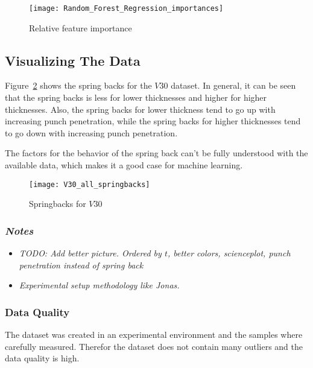 \begin{figure}[htb]
    \begin{tcolorbox}[arc=0pt,boxrule=0.5pt]
        \centering
        \texttt{[image: Random\_Forest\_Regression\_importances]}
        \caption{Relative feature importance}
        \label{fig:rf_feature_importance}
    \end{tcolorbox}
\end{figure}

\subsection{Visualizing The Data}\label{subsec:visualizing-the-data}
Figure~\ref{fig:v30_springbacks} shows the spring backs for the $V30$ dataset.
In general, it can be seen that the spring backs is less for lower thicknesses and higher for
higher thicknesses.
Also, the spring backs for lower thickness tend to go up with increasing punch penetration, while
the spring backs
for higher thicknesses tend to go down with increasing punch penetration.

The factors for the behavior of the spring back can't be fully understood with the available
data, which makes it a
good case for machine learning.

\begin{figure}[htb]
    \begin{tcolorbox}[arc=0pt,boxrule=0.5pt]
        \centering
        \texttt{[image: V30\_all\_springbacks]}
        \caption{Springbacks for $V30$}
        \label{fig:v30_springbacks}
    \end{tcolorbox}
\end{figure}

\subsubsection*{\textit{Notes}}
\begin{itemize}
    \item \textit{TODO: Add better picture. Ordered by $t$, better colors, scienceplot, punch
    penetration instead of spring back}
    \item \textit{Experimental setup methodology like Jonas.}
\end{itemize}

\subsubsection{Data Quality}
The dataset was created in an experimental environment and the samples where carefully measured.
Therefor the dataset does not contain many outliers and the data quality is high.

